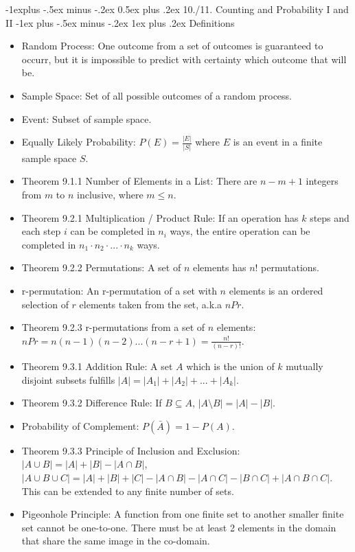 \documentclass[10pt, portrait]{article}
\makeatletter
\renewcommand{\section}{\@startsection{section}{1}{0mm}%
                                {-1ex plus -.5ex minus -.2ex}%
                                {0.5ex plus .2ex}%
                                {\normalfont\large\bfseries}}
\renewcommand{\section}{\@startsection{section}{2}{0mm}%
                                {-1explus -.5ex minus -.2ex}%
                                {0.5ex plus .2ex}%
                                {\normalfont\normalsize\bfseries}}
\renewcommand{\subsection}{\@startsection{subsection}{3}{0mm}%
                                {-1ex plus -.5ex minus -.2ex}%
                                {1ex plus .2ex}%
                                {\normalfont\small\bfseries}}%
\makeatother
\begin{document}
\begin{multicols*}{2}
\section{10./11. Counting and Probability I and II}
\subsection{Definitions}
\begin{itemize}
    \item Random Process: One outcome from a set of outcomes is guaranteed to occurr, but it is impossible to predict with certainty which outcome that will be.
    \item Sample Space: Set of all possible outcomes of a random process.
    \item Event: Subset of sample space.
    \item Equally Likely Probability: $P(E) = \frac{|E|}{|S|}$ where $E$ is an event in a finite sample space $S$.
    \item Theorem 9.1.1 Number of Elements in a List: There are $n-m+1$ integers from $m$ to $n$ inclusive, where $m \leq n$.
    \item Theorem 9.2.1 Multiplication / Product Rule: If an operation has $k$ steps and each step $i$ can be completed in $n_i$ ways, the entire operation can be completed in $n_1 \cdot n_2 \cdot ... \cdot n_k$ ways.
    \item Theorem 9.2.2 Permutations: A set of $n$ elements has $n!$ permutations.
    \item r-permutation: An r-permutation of a set with $n$ elements is an ordered selection of $r$ elements taken from the set, a.k.a $nPr$.
    \item Theorem 9.2.3 r-permutations from a set of $n$ elements: $nPr = n(n-1)(n-2)...(n-r+1) = \frac{n!}{(n-r)!}$.
    \item Theorem 9.3.1 Addition Rule: A set $A$ which is the union of $k$ mutually disjoint subsets fulfills $|A|=|A_1|+|A_2|+...+|A_k|$.
    \item Theorem 9.3.2 Difference Rule: If $B \subseteq A$, $|A \setminus B| = |A|-|B|$.
    \item Probability of Complement: $P(\bar{A})=1-P(A)$.
    \item Theorem 9.3.3 Principle of Inclusion and Exclusion: $|A \cup B| = |A|+|B|-|A \cap B|$, $|A \cup B \cup C|=|A|+|B|+|C|-|A \cap B|-|A \cap C|-|B \cap C|+|A \cap B \cap C|$. This can be extended to any finite number of sets.
    \item Pigeonhole Principle: A function from one finite set to another smaller finite set cannot be one-to-one. There must be at least 2 elements in the domain that share the same image in the co-domain.

\end{itemize}
\end{multicols*}
\end{document}
